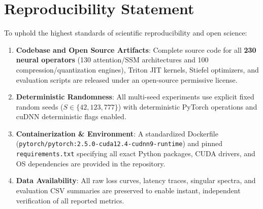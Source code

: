 \section{Reproducibility Statement}
\label{sec:reproducibility}

To uphold the highest standards of scientific reproducibility and open science:
\begin{enumerate}
    \item \textbf{Codebase and Open Source Artifacts}: Complete source code for all \textbf{230 neural operators} (130 attention/SSM architectures and 100 compression/quantization engines), Triton JIT kernels, Stiefel optimizers, and evaluation scripts are released under an open-source permissive license.
    \item \textbf{Deterministic Randomness}: All multi-seed experiments use explicit fixed random seeds ($S \in \{42, 123, 777\}$) with deterministic PyTorch operations and cuDNN deterministic flags enabled.
    \item \textbf{Containerization \& Environment}: A standardized Dockerfile (\texttt{pytorch/pytorch:2.5.0-cuda12.4-cudnn9-runtime}) and pinned \texttt{requirements.txt} specifying all exact Python packages, CUDA drivers, and OS dependencies are provided in the repository.
    \item \textbf{Data Availability}: All raw loss curves, latency traces, singular spectra, and evaluation CSV summaries are preserved to enable instant, independent verification of all reported metrics.
\end{enumerate}
